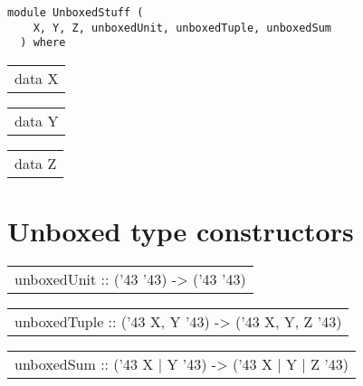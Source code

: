 \label{module:UnboxedStuff}
\haddockbeginheader
{\haddockverb\begin{verbatim}
module UnboxedStuff (
    X, Y, Z, unboxedUnit, unboxedTuple, unboxedSum
  ) where\end{verbatim}}
\haddockendheader

\begin{haddockdesc}
\item[\begin{tabular}{@{}l}
data X
\end{tabular}]
\end{haddockdesc}
\begin{haddockdesc}
\item[\begin{tabular}{@{}l}
data Y
\end{tabular}]
\end{haddockdesc}
\begin{haddockdesc}
\item[\begin{tabular}{@{}l}
data Z
\end{tabular}]
\end{haddockdesc}
\section{Unboxed type constructors}
\begin{haddockdesc}
\item[\begin{tabular}{@{}l}
unboxedUnit :: ({\char '43} {\char '43}) -> ({\char '43} {\char '43})
\end{tabular}]
\item[\begin{tabular}{@{}l}
unboxedTuple :: ({\char '43} X, Y {\char '43}) -> ({\char '43} X, Y, Z {\char '43})
\end{tabular}]
\item[\begin{tabular}{@{}l}
unboxedSum :: ({\char '43} X | Y {\char '43}) -> ({\char '43} X | Y | Z {\char '43})
\end{tabular}]
\end{haddockdesc}